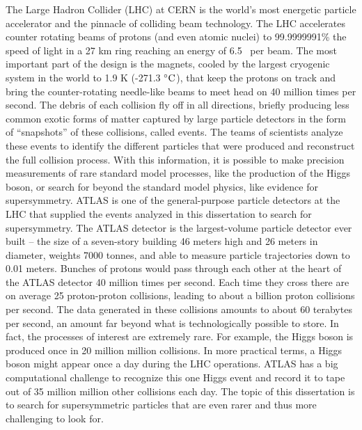 The Large Hadron Collider (LHC) at CERN is the world's most energetic 
particle accelerator and the pinnacle of colliding beam technology.
The LHC accelerates counter rotating beams of protons (and even atomic nuclei)
to 99.9999991\% the speed of light in a 27 km ring reaching an energy of 
6.5 \TeV~per beam. 
The most important part of the design is the magnets, cooled 
by the largest cryogenic system in the world to 1.9 K (-271.3 $^{\circ}{\rm C}$), that keep the 
protons on track and bring the counter-rotating needle-like
beams 
to meet head on 40 million times per second. 
The debris of each collision fly off in all directions, 
briefly producing less common exotic forms of matter
captured by large particle detectors in the form of ``snapshots'' of these collisions, called events.
The teams of scientists analyze these events to identify the different particles that were produced 
and reconstruct the full collision process.
With this information, it is possible to make precision measurements of rare standard model processes, like 
the production of the Higgs boson, or search for beyond the standard model physics, like evidence 
for supersymmetry.
ATLAS is one of the general-purpose particle detectors at the LHC that supplied the events 
analyzed in this dissertation to search for supersymmetry. 
The ATLAS detector is the largest-volume particle detector ever built --
the size of a seven-story building 46 meters high and 26 meters in diameter, 
weights 7000 tonnes, %
and able to measure particle trajectories down to 0.01 meters.
Bunches of protons would pass through each other at the heart of 
the ATLAS detector 40 million times per second.
Each time they cross there are on average 25 proton-proton collisions, leading to 
about a billion proton collisions per second. 
The data generated in these collisions amounts to about 60 terabytes per second, 
an amount far beyond what is technologically possible to store.
In fact, the processes of interest are extremely rare.
For example, the Higgs boson is produced once in 20 million million collisions.
In more practical terms, a Higgs boson might appear once a day during the LHC operations.
ATLAS has a big computational challenge to recognize this one Higgs event and record it to tape 
out of 35 million million other collisions each day.
The topic of this dissertation is to search for supersymmetric particles that 
are even rarer and thus more challenging to look for. 

